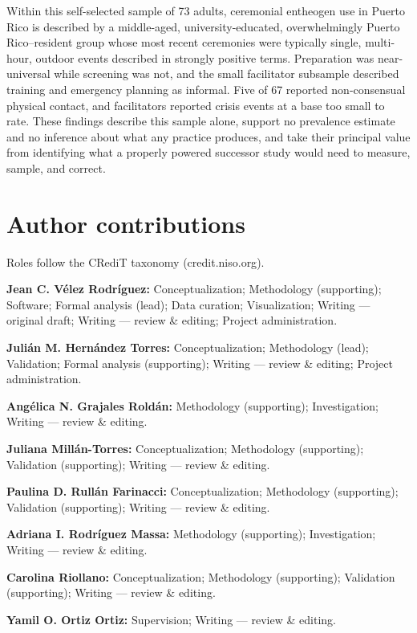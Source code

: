 \documentclass[12pt]{article}
\begin{document}
Within this self-selected sample of 73 adults, ceremonial entheogen use in Puerto Rico is described by a
middle-aged, university-educated, overwhelmingly Puerto Rico--resident group whose most recent ceremonies
were typically single, multi-hour, outdoor events described in strongly positive terms. Preparation was
near-universal while screening was not, and the small facilitator subsample described training and
emergency planning as informal. Five of 67 reported non-consensual physical contact, and facilitators
reported crisis events at a base too small to rate. These findings describe this sample alone, support no
prevalence estimate and no inference about what any practice produces, and take their principal value from
identifying what a properly powered successor study would need to measure, sample, and correct.

\section*{Author contributions}
Roles follow the CRediT taxonomy (\textsf{credit.niso.org}).

\noindent\textbf{Jean C. V\'elez Rodr\'iguez:} Conceptualization; Methodology (supporting); Software;
Formal analysis (lead); Data curation; Visualization; Writing --- original draft; Writing --- review \&
editing; Project administration.

\noindent\textbf{Juli\'an M. Hern\'andez Torres:} Conceptualization; Methodology (lead); Validation;
Formal analysis (supporting); Writing --- review \& editing; Project administration.

\noindent\textbf{Ang\'elica N. Grajales Rold\'an:} Methodology (supporting); Investigation; Writing ---
review \& editing.

\noindent\textbf{Juliana Mill\'an-Torres:} Conceptualization; Methodology (supporting); Validation
(supporting); Writing --- review \& editing.

\noindent\textbf{Paulina D. Rull\'an Farinacci:} Conceptualization; Methodology (supporting); Validation
(supporting); Writing --- review \& editing.

\noindent\textbf{Adriana I. Rodr\'iguez Massa:} Methodology (supporting); Investigation; Writing ---
review \& editing.

\noindent\textbf{Carolina Riollano:} Conceptualization; Methodology (supporting); Validation
(supporting); Writing --- review \& editing.

\noindent\textbf{Yamil O. Ortiz Ortiz:} Supervision; Writing --- review \& editing.
\end{document}
